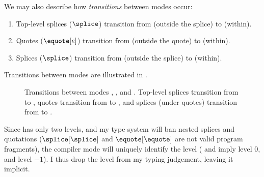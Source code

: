 We may also describe how \textit{transitions} between modes occur:
\begin{enumerate}
  \item Top-level splices ($\splice$) transition from \compilemode{} (outside the splice) to \splicemode{} (within).
  \item Quotes ($\equote[e]$) transition from \splicemode{} (outside the quote) to \quotemode{} (within).
  \item Splices ($\splice$) transition from \quotemode{} (outside the splice) to \splicemode{} (within).
\end{enumerate}
Transitions between modes are illustrated in .

\begin{figure}
  \centering
{}
\caption{Transitions between modes \compilemode{}, \splicemode{}, and \quotemode{}. Top-level splices transition from \compilemode{} to \splicemode{}, quotes transition from \splicemode{} to \quotemode{}, and splices (under quotes) transition from \quotemode{} to \splicemode{}.}%
\label{fig:compiler-mode-transitions}
\end{figure}

Since \sourceLang{} has only two levels, and my type system will ban nested splices and quotations ($\splice[\splice]$ and $\equote[\equote]$ are not valid program fragments), the compiler mode will uniquely identify the level (\compilemode{} and \quotemode{} imply level $0$, and \splicemode{} level $-1$). I thus drop the level from my typing judgement, leaving it implicit.

\newcommand{\cqtypejudge}[3][\Gamma]{{#1} \vdash_{\compilemode \mid \quotemode} {#2} : {#3}}
\newcommand{\ctypejudge}[3][\Gamma]{{#1} \vdash_{\compilemode} {#2} : {#3}}
\newcommand{\qtypejudge}[3][\Gamma]{{#1} \vdash_{\quotemode} {#2} : {#3}}
\newcommand{\stypejudge}[3][\Gamma]{{#1} \vdash_{\splicemode} {#2} : {#3}}

